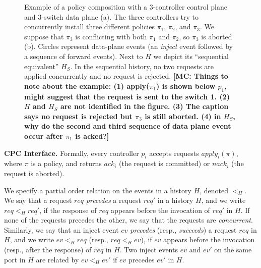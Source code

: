 \documentclass[11pt,pdftex,letter]{article}
\newcommand{\mcnote}[1]{\textcolor{heraldBlue}{\small \bf [MC: #1]}}
\newcommand{\mcnote}[1]{}
\newcommand{\ack}{\textit{ack}}
\newcommand{\nack}{\textit{nack}}
\begin{document}
\begin{figure}[t]
\centering
{}
\vspace{-1.0em}
\caption{Example of a policy composition with a $3$-controller control
  plane and $3$-switch data plane (a).
The three controllers try to
concurrently install three different policies $\pi_1$, $\pi_2$, and
$\pi_3$. We suppose that  $\pi_3$ is conflicting with both
$\pi_1$ and $\pi_2$, so $\pi_3$ is aborted (b).
Circles represent data-plane events (an \emph{inject} event followed
by a sequence of forward events).
Next to $H$ we depict its ``sequential equivalent''
$H_S$. In the sequential history, no two requests
are applied concurrently and no request is rejected.
\mcnote{Things to note about the example:
(1) apply($\pi_1$) is shown below $p_1$, might suggest that the request is sent to the switch 1.
(2) $H$ and $H_S$ are not identified in the figure.
(3) The caption says no request is rejected but $\pi_3$ is still aborted.
(4) in $H_S$, why do the second and third sequence of data plane event occur after $\pi_1$ is acked?}
}
\label{fig:examples}
\vspace{-1.0em}
\end{figure}

\vspace{1mm}\noindent\textbf{CPC Interface.}
Formally, every controller $p_i$ accepts requests
$\textit{apply}_i(\pi)$, where $\pi$ is a policy,
and returns $\ack_{i}$ (the request is committed) or $\nack_{i}$
(the request is aborted).

We specify a partial order relation on the events in a history $H$,
denoted $<_H$.
We say that a request $\textit{req}$ \emph{precedes} a request
$\textit{req}'$ in a history $H$, and we write $\textit{req} <_H
\textit{req}'$, if the response of
$\textit{req}$ appears before the invocation of $\textit{req}'$ in $H$.
If none of the requests precedes the other, we say that the requests
are \emph{concurrent}.
Similarly, we say that an inject event $ev$ \emph{precedes} (resp.,
\emph{succeeds}) a request $\textit{req}$ in $H$, and we write $ev <_H
\textit{req}$ (resp., $\textit{req} <_H ev$),  if $ev$ appears before the
invocation (resp., after the response) of
$\textit{req}$ in $H$.
Two inject events $ev$ and $ev'$ on the same port in $H$
are related by $ev <_H ev'$ if
$ev$ precedes $ev'$ in $H$.
\end{document}

